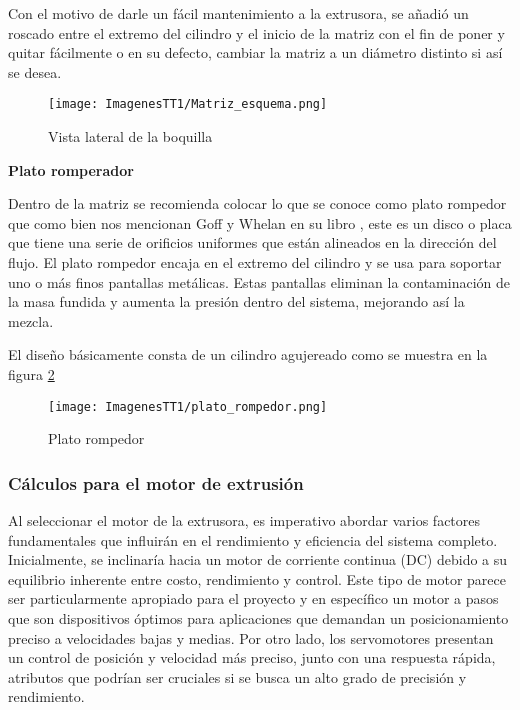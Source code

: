 \documentclass[14pt,oneside]{extarticle} %
\begin{document}
Con el motivo de darle un fácil mantenimiento a la extrusora, se añadió un roscado entre el extremo del cilindro y el inicio de la matriz con el fin de poner y quitar fácilmente o en su defecto, cambiar la matriz a un diámetro distinto si así se desea.

\begin{figure}[H]
    \centering
    \texttt{[image: ImagenesTT1/Matriz\_esquema.png]}
    \caption{Vista lateral de la boquilla}
    \label{fig:Matriz_esquema}
\end{figure}

\textbf{Plato romperador}

Dentro de la matriz se recomienda colocar lo que se conoce como plato rompedor que como bien nos mencionan Goff y Whelan en su libro \cite{goff2009dynisco}, este es un disco o placa que tiene una serie de orificios uniformes que están alineados en la dirección del flujo. El plato rompedor encaja en el extremo del cilindro y se usa para soportar uno o más finos pantallas metálicas. Estas pantallas eliminan la contaminación de la masa fundida y aumenta la presión dentro del sistema, mejorando así la mezcla.

El diseño básicamente consta de un cilindro agujereado como se muestra en la figura \ref{fig:plato_rompedor}

\begin{figure}[H]
    \centering
    \texttt{[image: ImagenesTT1/plato\_rompedor.png]}
    \caption{Plato rompedor}
    \label{fig:plato_rompedor}
\end{figure}

\subsubsection{Cálculos para el motor de extrusión}
Al seleccionar el motor de la extrusora, es imperativo abordar varios factores fundamentales que influirán en el rendimiento y eficiencia del sistema completo. Inicialmente, se inclinaría hacia un motor de corriente continua (DC) debido a su equilibrio inherente entre costo, rendimiento y control. Este tipo de motor parece ser particularmente apropiado para el proyecto y en específico un motor a pasos que son dispositivos óptimos para aplicaciones que demandan un posicionamiento preciso a velocidades bajas y medias. Por otro lado, los servomotores presentan un control de posición y velocidad más preciso, junto con una respuesta rápida, atributos que podrían ser cruciales si se busca un alto grado de precisión y rendimiento.
\end{document}
